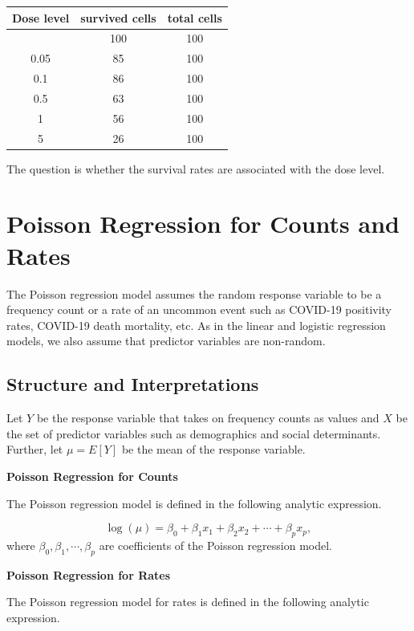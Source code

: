 \documentclass[
]{book}
\begin{document}
\begin{longtable}[]{@{}ccc@{}}
\toprule\noalign{}
Dose level & survived cells & total cells \\
\midrule\noalign{}
\endhead
\bottomrule\noalign{}
\endlastfoot
0 & 100 & 100 \\
0.05 & 85 & 100 \\
0.1 & 86 & 100 \\
0.5 & 63 & 100 \\
1 & 56 & 100 \\
5 & 26 & 100 \\
\end{longtable}

The question is whether the survival rates are associated with the dose level.

\hypertarget{poisson-regression-for-counts-and-rates}{%
\section{Poisson Regression for Counts and Rates}\label{poisson-regression-for-counts-and-rates}}

The Poisson regression model assumes the random response variable to be a frequency count or a rate of an uncommon event such as COVID-19 positivity rates, COVID-19 death mortality, etc. As in the linear and logistic regression models, we also assume that predictor variables are non-random.

\hypertarget{structure-and-interpretations}{%
\subsection{Structure and Interpretations}\label{structure-and-interpretations}}

Let \(Y\) be the response variable that takes on frequency counts as values and \(X\) be the set of predictor variables such as demographics and social determinants. Further, let \(\mu=E[Y]\) be the mean of the response variable.

\textbf{Poisson Regression for Counts}

The Poisson regression model is defined in the following analytic expression.

\[
\log(\mu) = \beta_0 + \beta_1 x_1 + \beta_2 x_2 + \cdots + \beta_p x_p,
\]
where \(\beta_0, \beta_1, \cdots, \beta_p\) are coefficients of the Poisson regression model.

\textbf{Poisson Regression for Rates}

The Poisson regression model for rates is defined in the following analytic expression.
\end{document}
